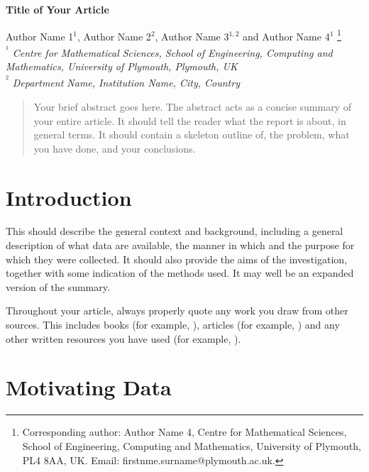 \documentclass[a4paper,amsmath, 12pt]{article}
\begin{document}
\begin{center}
\textbf{\Large Title of Your Article}

\vspace{0.5cm}

Author Name 1$^{1}$, Author Name 2$^{2}$,  Author Name 3$^{1,2}$ and Author Name 4$^{1}$ \footnote[1]{Corresponding author: Author Name 4, Centre for Mathematical Sciences, School of Engineering, Computing and Mathematics, University of Plymouth, PL4 8AA, UK. Email: firstnme.surname@plymouth.ac.uk.} \\

{\it {\textsuperscript{$^{1}$} Centre for Mathematical Sciences,  School of Engineering, Computing and Mathematics, University of Plymouth, Plymouth, UK \\}}
{\it {\textsuperscript{$^{2}$} Department Name, Institution Name, City, Country}}
\end{center}


\begin{abstract}
\noindent
Your brief abstract goes here. The abstract acts as a concise summary of your entire article. It should tell the reader what the report is about, in general terms. It should contain a skeleton
outline of,  the problem, what you have done, and your conclusions.


\end{abstract}


\section{Introduction}
This should describe the general context and background, including a general
description of what data are available, the manner in which and the purpose for
which they were collected.  It should also provide the aims of the investigation,
together with some indication of the methods used. It may well be an expanded
version of the summary.

Throughout your article, always properly quote any work you draw from other sources. This includes books (for example, \cite{james:2013} ), articles (for example, \cite{Seiichiro:2011}) and any other written resources you have used (for example, \cite{ONS}). \\

\section{Motivating Data}
\end{document}
